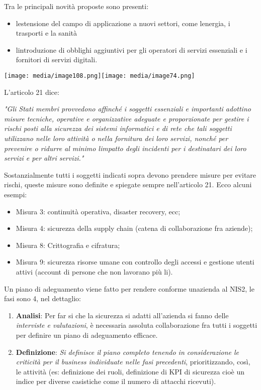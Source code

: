 Tra le principali novità proposte sono presenti:

\begin{itemize}
\item
  l\textquotesingle estensione del campo di applicazione a nuovi
  settori, come l\textquotesingle energia, i trasporti e la sanità
\item
  l\textquotesingle introduzione di obblighi aggiuntivi per gli
  operatori di servizi essenziali e i fornitori di servizi digitali.
\end{itemize}

\texttt{[image: media/image108.png]}\texttt{[image: media/image74.png]}

L'articolo 21 dice:

\emph{"Gli Stati membri provvedono affinché i soggetti essenziali e
importanti adottino misure tecniche, operative e organizzative adeguate
e proporzionate per gestire i rischi posti alla sicurezza dei sistemi
informatici e di rete che tali soggetti utilizzano nelle loro attività o
nella fornitura dei loro servizi, nonché per prevenire o ridurre al
minimo l\textquotesingle impatto degli incidenti per i destinatari dei
loro servizi e per altri servizi."}

Sostanzialmente tutti i soggetti indicati sopra devono prendere misure
per evitare rischi, queste misure sono definite e spiegate sempre
nell'articolo 21. Ecco alcuni esempi:

\begin{itemize}
\item
  Misura 3: continuità operativa, disaster recovery, ecc;
\item
  Misura 4: sicurezza della supply chain (catena di collaborazione fra
  aziende);
\item
  Misura 8: Crittografia e cifratura;
\item
  Misura 9: sicurezza risorse umane con controllo degli accessi e
  gestione utenti attivi (account di persone che non lavorano più li).
\end{itemize}

Un piano di adeguamento viene fatto per rendere conforme
un\textquotesingle azienda al NIS2, le fasi sono 4, nel dettaglio:

\begin{enumerate}
\def\labelenumi{\arabic{enumi}.}
\item
  \textbf{Analisi}: Per far si che la sicurezza si adatti all'azienda si
  fanno delle \emph{interviste e valutazioni}, è necessaria assoluta
  collaborazione fra tutti i soggetti per definire un piano di
  adeguamento efficace.
\item
  \textbf{Definizione}: \emph{Si definisce il piano completo tenendo in
  considerazione le criticità per il business individuate nelle fasi
  precedenti}, prioritizzando, così, le attività (es: definizione dei
  ruoli, definizione di KPI di sicurezza cioè un indice per diverse
  casistiche come il numero di attacchi ricevuti).
\end{enumerate}

